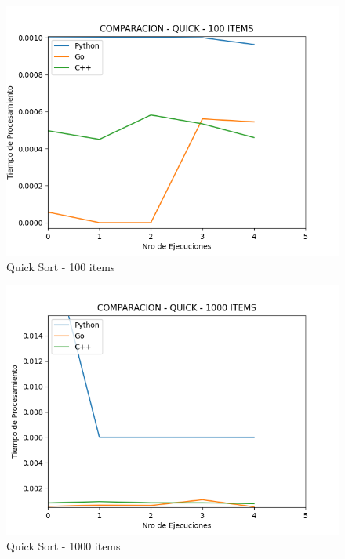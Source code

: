 \documentclass[12pt]{article} %
\begin{document}
\begin{figure}[H]
    \centering
    \includegraphics[width=\textwidth]{quick_100}
    \caption{Quick Sort - 100 items}
    \end{figure}
    
    \vspace{5mm}
    
    \begin{figure}[H]
    \centering
    \includegraphics[width=\textwidth]{quick_1000}
    \caption{Quick Sort - 1000 items}
    \end{figure}
    
    \vspace{5mm}
    
\end{document}
